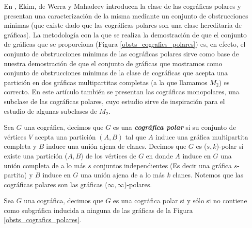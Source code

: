 En \cite{Ekim}, Ekim, de Werra y Mahadeev introducen
la clase de las cográficas polares y presentan una
caracterizaci\'on de la misma mediante un conjunto de
obstrucciones mínimas (que existe dado que las
cográficas polares son una clase hereditaria de gráficas).
La metodología con la que se realiza la demostración de que el conjunto de gráficas que se proporciona (Figura \ref{obsts_cografics_polares}) es, en efecto, el conjunto de obstrucciones mínimas de las cográficas polares sirve como base de nuestra demostración de que el conjunto de gráficas que mostramos como conjunto de obstrucciones mínimas de la clase de cográficas que acepta una partición en dos gráficas multipartitas completas (a la que llamamos $M_2$) es correcto. En este artículo también se presentan las cográficas monopolares, una subclase de las cográficas polares, cuyo estudio sirve de inspiración para el estudio de algunas subclases de $M_2$.

Sea $G$ una cográfica, decimos que $G$ es una \emph{\textbf{cográfica polar}} si su conjunto de vértices $V$ acepta una partición $(A,B)$ tal que $A$ induce una gráfica multipartita completa y $B$ induce una unión ajena de clanes.
Decimos que $G$ es ($s,k$)-polar si existe una partición ($A,B$) de los vértices de $G$ en donde $A$ induce en $G$ una unión completa de a lo más $s$ conjuntos independientes (Es decir una gráfica $s$-partita) y $B$ induce en $G$ una unión ajena de a lo más $k$ clanes. Notemos que las cográficas polares son las gráficas ($\infty, \infty$)-polares.

\begin{theorem}
    Sea $G$ una cográfica, decimos que $G$ es una cográfica polar si y sólo si no contiene como subgráfica inducida a ninguna de las gráficas de la Figura \ref{obsts_cografics_polares}.
\end{theorem}

